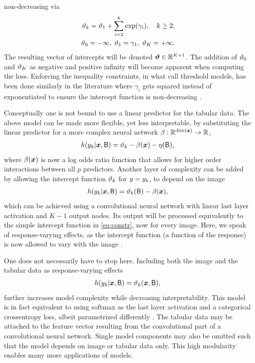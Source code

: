 \documentclass[article,nojss,shortnames]{jss}\usepackage[]{graphicx}\usepackage[]{color}
\begin{document}
non-decreasing via
\begin{align} \label{eq:constr}
  \begin{split}
  \vartheta_k = \vartheta_1 + \sum_{i = 2}^k \exp(\gamma_i), \quad k \geq 2, \\
  \vartheta_0 = - \infty, \; \vartheta_1 = \gamma_1, \; \vartheta_K = + \infty.
  \end{split}
\end{align}
The resulting vector of intercepts will be denoted $\text{\boldmath$\vartheta$} \in \mathbb{R}^{K + 1}$.
The addition of $\vartheta_0$ and $\vartheta_K$ as negative and positive infinity
will become apparent when computing the loss.
Enforcing the inequality constraints, in what \citet{cheng2008neural} call
threshold models, has been done similarly in the literature where $\gamma_i$
gets squared instead of exponentiated to ensure the intercept function is
non-decreasing \citep{liu2019probabilistic, vargas2020cumulative}.

Conceptually one is not bound to use a linear predictor for the tabular
data. The above model can be made more flexible, yet less interpretable, by
substituting the linear predictor for a more complex neural network
$\beta : \mathbb{R}^{\dim(\boldsymbol x)} \rightarrow \mathbb{R}$,
\begin{align*}
  h(y_k \rvert \boldsymbol x, \mathsf{B}) = \vartheta_k - \beta(\boldsymbol x) - \eta(\mathsf{B}),
\end{align*}
where $\beta(\boldsymbol x)$ is now a log odds ratio function that allows for higher order
interactions between all $p$ predictors.
Another layer of complexity can be added by allowing the intercept function
$\vartheta_k$ for $y = y_k$, to depend on the image
\begin{align*}
  h(y_k \rvert \boldsymbol x, \mathsf{B}) = \vartheta_k(\mathsf{B}) - \beta(\boldsymbol x),
\end{align*}
which can be achieved using a convolutional neural network with linear last
layer activation and $K - 1$ output nodes. Its output will be processed
equivalently to the simple intercept function in \eqref{eq:constr}, now
for every image.
Here, we speak of response-varying effects, as the intercept function
(a function of the response) is now allowed to vary with the image \citep{hothorn2018most}.

One does not necessarily have to stop here. Including both the image and
the tabular data as response-varying effects
\begin{align*}
  h(y_k \rvert \boldsymbol x, \mathsf{B}) = \vartheta_k(\boldsymbol x, \mathsf{B}),
\end{align*}
further increases model complexity while decreasing interpretability.
This model is in fact equivalent to using softmax as the last layer activation
and a categorical crossentropy loss, albeit parametrized differently
\citep{hothorn2014conditional}.
The tabular data may be attached to the feature vector resulting from the
convolutional part of a convolutional neural network.
Single model components may also be omitted such that the model depends on image
or tabular data only. This high modularity enables many more applications of
 models.
\end{document}
